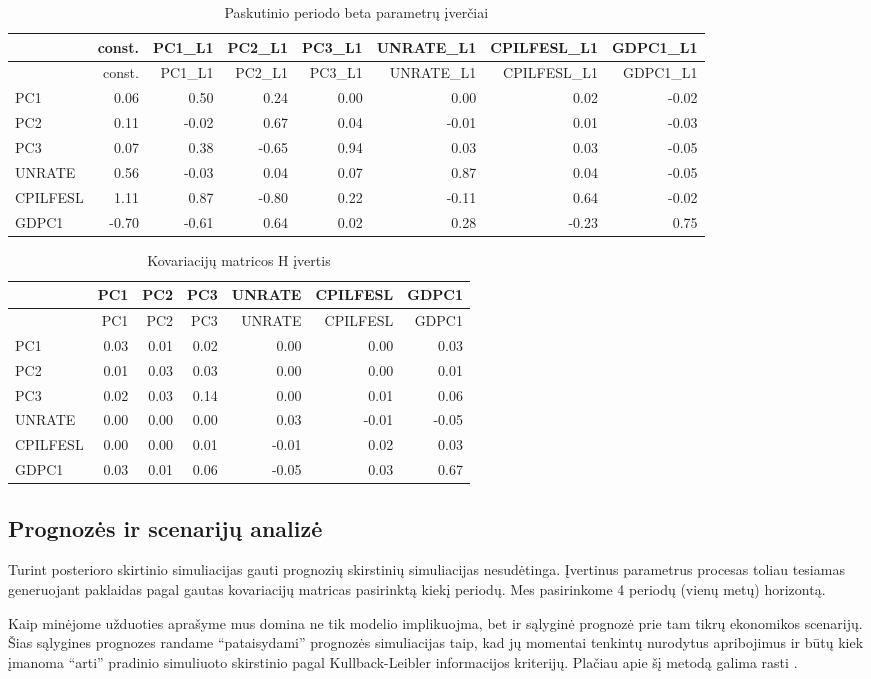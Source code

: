 \documentclass[12pt,lithuanian,]{article}
\begin{document}
\begin{longtable}[]{@{}lrrrrrrr@{}}
\caption{\label{table:betaTable}Paskutinio periodo beta parametrų
įverčiai}\tabularnewline
\toprule
& const. & PC1\_L1 & PC2\_L1 & PC3\_L1 & UNRATE\_L1 & CPILFESL\_L1 &
GDPC1\_L1\tabularnewline
\midrule
\endfirsthead
\toprule
& const. & PC1\_L1 & PC2\_L1 & PC3\_L1 & UNRATE\_L1 & CPILFESL\_L1 &
GDPC1\_L1\tabularnewline
\midrule
\endhead
PC1 & 0.06 & 0.50 & 0.24 & 0.00 & 0.00 & 0.02 & -0.02\tabularnewline
PC2 & 0.11 & -0.02 & 0.67 & 0.04 & -0.01 & 0.01 & -0.03\tabularnewline
PC3 & 0.07 & 0.38 & -0.65 & 0.94 & 0.03 & 0.03 & -0.05\tabularnewline
UNRATE & 0.56 & -0.03 & 0.04 & 0.07 & 0.87 & 0.04 & -0.05\tabularnewline
CPILFESL & 1.11 & 0.87 & -0.80 & 0.22 & -0.11 & 0.64 &
-0.02\tabularnewline
GDPC1 & -0.70 & -0.61 & 0.64 & 0.02 & 0.28 & -0.23 & 0.75\tabularnewline
\bottomrule
\end{longtable}

\begin{longtable}[]{@{}lrrrrrr@{}}
\caption{\label{table:H}Kovariacijų matricos H įvertis}\tabularnewline
\toprule
& PC1 & PC2 & PC3 & UNRATE & CPILFESL & GDPC1\tabularnewline
\midrule
\endfirsthead
\toprule
& PC1 & PC2 & PC3 & UNRATE & CPILFESL & GDPC1\tabularnewline
\midrule
\endhead
PC1 & 0.03 & 0.01 & 0.02 & 0.00 & 0.00 & 0.03\tabularnewline
PC2 & 0.01 & 0.03 & 0.03 & 0.00 & 0.00 & 0.01\tabularnewline
PC3 & 0.02 & 0.03 & 0.14 & 0.00 & 0.01 & 0.06\tabularnewline
UNRATE & 0.00 & 0.00 & 0.00 & 0.03 & -0.01 & -0.05\tabularnewline
CPILFESL & 0.00 & 0.00 & 0.01 & -0.01 & 0.02 & 0.03\tabularnewline
GDPC1 & 0.03 & 0.01 & 0.06 & -0.05 & 0.03 & 0.67\tabularnewline
\bottomrule
\end{longtable}

\subsection{Prognozės ir scenarijų
analizė}\label{prognozes-ir-scenariju-analize}

Turint posterioro skirtinio simuliacijas gauti prognozių skirstinių
simuliacijas nesudėtinga. Įvertinus parametrus procesas toliau tesiamas
generuojant paklaidas pagal gautas kovariacijų matricas pasirinktą kiekį
periodų. Mes pasirinkome 4 periodų (vienų metų) horizontą.

Kaip minėjome užduoties aprašyme mus domina ne tik modelio implikuojma,
bet ir sąlyginė prognozė prie tam tikrų ekonomikos scenarijų. Šias
sąlygines prognozes randame ``pataisydami'' prognozės simuliacijas taip,
kad jų momentai tenkintų nurodytus apribojimus ir būtų kiek įmanoma
``arti'' pradinio simuliuoto skirstinio pagal Kullback-Leibler
informacijos kriterijų. Plačiau apie šį metodą galima rasti
\citet{Robertson2005}.
\end{document}
